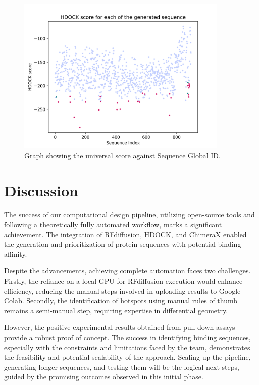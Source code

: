 \documentclass[11pt,a4paper]{article}
\begin{document}
\begin{figure}[ht]
    \centering
    \includegraphics[width=0.9\textwidth]{Figures/universal_score_against_Sequence_Global_ID.png}
    \caption{Graph showing the universal score against Sequence Global ID.}
    \label{fig:universal_score}
\end{figure}

\section{Discussion}

The success of our computational design pipeline, utilizing open-source tools and following a theoretically fully automated workflow, marks a significant achievement. The integration of RFdiffusion, HDOCK, and ChimeraX enabled the generation and prioritization of protein sequences with potential binding affinity.

Despite the advancements, achieving complete automation faces two challenges. Firstly, the reliance on a local GPU for RFdiffusion execution would enhance efficiency, reducing the manual steps involved in uploading results to Google Colab. Secondly, the identification of hotspots using manual rules of thumb remains a semi-manual step, requiring expertise in differential geometry.

However, the positive experimental results obtained from pull-down assays provide a robust proof of concept. The success in identifying binding sequences, especially with the constraints and limitations faced by the team, demonstrates the feasibility and potential scalability of the approach. Scaling up the pipeline, generating longer sequences, and testing them will be the logical next steps, guided by the promising outcomes observed in this initial phase.
\end{document}
